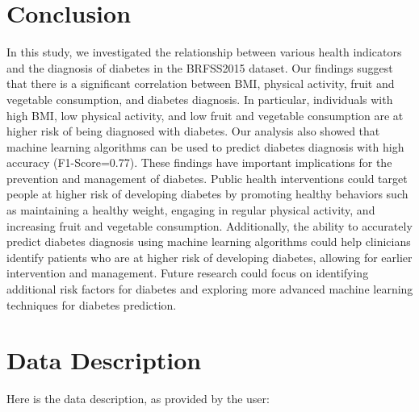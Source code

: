 \documentclass[12pt]{article}
\begin{document}
\section{Conclusion}
In this study, we investigated the relationship between various health indicators and the diagnosis of diabetes in the BRFSS2015 dataset. Our findings suggest that there is a significant correlation between BMI, physical activity, fruit and vegetable consumption, and diabetes diagnosis. In particular, individuals with high BMI, low physical activity, and low fruit and vegetable consumption are at higher risk of being diagnosed with diabetes. Our analysis also showed that machine learning algorithms can be used to predict diabetes diagnosis with high accuracy (F1-Score=0.77). These findings have important implications for the prevention and management of diabetes. Public health interventions could target people at higher risk of developing diabetes by promoting healthy behaviors such as maintaining a healthy weight, engaging in regular physical activity, and increasing fruit and vegetable consumption. Additionally, the ability to accurately predict diabetes diagnosis using machine learning algorithms could help clinicians identify patients who are at higher risk of developing diabetes, allowing for earlier intervention and management. Future research could focus on identifying additional risk factors for diabetes and exploring more advanced machine learning techniques for diabetes prediction.





\clearpage
\appendix
\section{Data Description} \label{sec:data_description} Here is the data description, as provided by the user:
\end{document}
